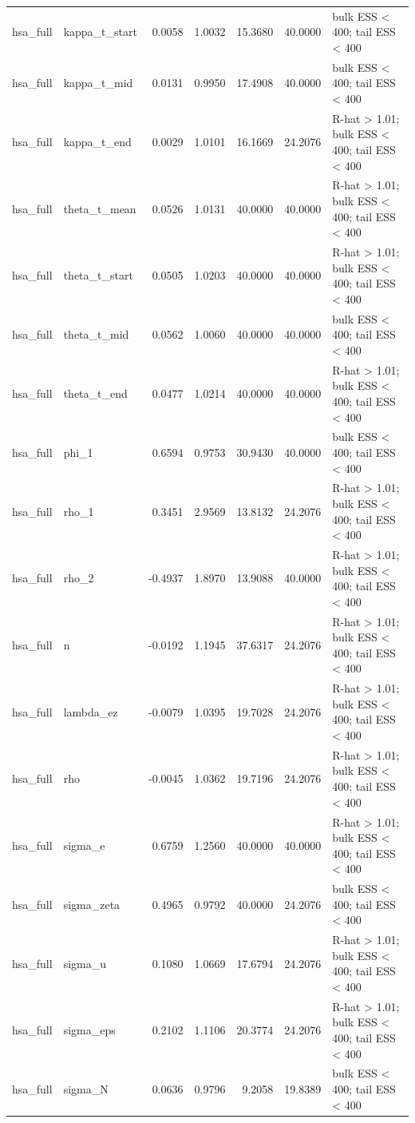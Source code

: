 \begin{tabular}{llrrrrl}
hsa\_full & kappa\_t\_start & 0.0058 & 1.0032 & 15.3680 & 40.0000 & bulk ESS < 400; tail ESS < 400 \\
hsa\_full & kappa\_t\_mid & 0.0131 & 0.9950 & 17.4908 & 40.0000 & bulk ESS < 400; tail ESS < 400 \\
hsa\_full & kappa\_t\_end & 0.0029 & 1.0101 & 16.1669 & 24.2076 & R-hat > 1.01; bulk ESS < 400; tail ESS < 400 \\
hsa\_full & theta\_t\_mean & 0.0526 & 1.0131 & 40.0000 & 40.0000 & R-hat > 1.01; bulk ESS < 400; tail ESS < 400 \\
hsa\_full & theta\_t\_start & 0.0505 & 1.0203 & 40.0000 & 40.0000 & R-hat > 1.01; bulk ESS < 400; tail ESS < 400 \\
hsa\_full & theta\_t\_mid & 0.0562 & 1.0060 & 40.0000 & 40.0000 & bulk ESS < 400; tail ESS < 400 \\
hsa\_full & theta\_t\_end & 0.0477 & 1.0214 & 40.0000 & 40.0000 & R-hat > 1.01; bulk ESS < 400; tail ESS < 400 \\
hsa\_full & phi\_1 & 0.6594 & 0.9753 & 30.9430 & 40.0000 & bulk ESS < 400; tail ESS < 400 \\
hsa\_full & rho\_1 & 0.3451 & 2.9569 & 13.8132 & 24.2076 & R-hat > 1.01; bulk ESS < 400; tail ESS < 400 \\
hsa\_full & rho\_2 & -0.4937 & 1.8970 & 13.9088 & 40.0000 & R-hat > 1.01; bulk ESS < 400; tail ESS < 400 \\
hsa\_full & n & -0.0192 & 1.1945 & 37.6317 & 24.2076 & R-hat > 1.01; bulk ESS < 400; tail ESS < 400 \\
hsa\_full & lambda\_ez & -0.0079 & 1.0395 & 19.7028 & 24.2076 & R-hat > 1.01; bulk ESS < 400; tail ESS < 400 \\
hsa\_full & rho & -0.0045 & 1.0362 & 19.7196 & 24.2076 & R-hat > 1.01; bulk ESS < 400; tail ESS < 400 \\
hsa\_full & sigma\_e & 0.6759 & 1.2560 & 40.0000 & 40.0000 & R-hat > 1.01; bulk ESS < 400; tail ESS < 400 \\
hsa\_full & sigma\_zeta & 0.4965 & 0.9792 & 40.0000 & 24.2076 & bulk ESS < 400; tail ESS < 400 \\
hsa\_full & sigma\_u & 0.1080 & 1.0669 & 17.6794 & 24.2076 & R-hat > 1.01; bulk ESS < 400; tail ESS < 400 \\
hsa\_full & sigma\_eps & 0.2102 & 1.1106 & 20.3774 & 24.2076 & R-hat > 1.01; bulk ESS < 400; tail ESS < 400 \\
hsa\_full & sigma\_N & 0.0636 & 0.9796 & 9.2058 & 19.8389 & bulk ESS < 400; tail ESS < 400 \\

\end{tabular}
